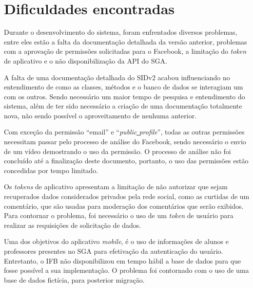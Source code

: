 \section{Dificuldades encontradas}
Durante o desenvolvimento do sistema, foram enfrentados diversos problemas, entre eles estão a falta da documentação detalhada da versão anterior, problemas com a aprovação de permissões solicitadas para o Facebook, a limitação do \textit{token} de aplicativo e o não disponibilização da API do SGA.

A falta de uma documentação detalhada do SIDv2 acabou influenciando no entendimento de como as classes, métodos e o banco de dados se interagiam um com os outros. Sendo necessário um maior tempo de pesquisa e entendimento do sistema, além de ter sido necessário a criação de uma documentação totalmente nova, não sendo possível o aproveitamento de nenhuma anterior.

Com exceção da permissão ``email'' e ``\textit{public\underline{{ }}profile}'', todas as outras permissões necessitam passar pelo processo de análise do Facebook, sendo necessário o envio de um vídeo demostrando o uso da permissão. O processo de análise não foi concluído até a finalização deste documento, portanto, o uso das permissões estão concedidas por tempo limitado.

Os \textit{tokens} de aplicativo apresentam a limitação de não autorizar que sejam recuperados dados considerados privados pela rede social, como as curtidas de um comentário, que são usadas para moderação dos comentários que serão exibidos. Para contornar o problema, foi necessário o uso de um \textit{token} de usuário para realizar as requisições de solicitação de dados.

Uma dos objetivos do aplicativo \textit{mobile}, é o uso de informações de alunos e professores presentes no SGA para efetivação da autenticação do usuário. Entretanto, o IFB não disponibilizou em tempo hábil a base de dados para que fosse possível a sua implementação. O problema foi contornado com o uso de uma base de dados fictícia, para posterior migração.